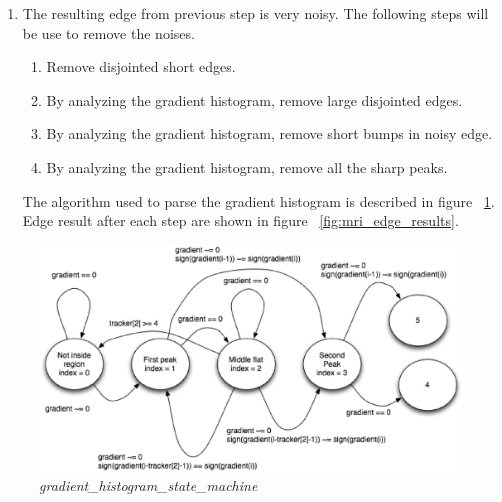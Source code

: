\begin{enumerate}
  \item The resulting edge from previous step is very noisy. The following steps will be use to remove the
    noises. 
    \begin{enumerate}
      \item Remove disjointed short edges.
      \item By analyzing the gradient histogram, remove large disjointed edges.
      \item By analyzing the gradient histogram, remove short bumps in noisy edge.
      \item By analyzing the gradient histogram, remove all the sharp peaks. 
    \end{enumerate}
    The algorithm used to parse the gradient histogram is described in figure ~\ref{fig:histogram_state_machine}. Edge result after each step are shown in figure ~\ref{fig:mri_edge_results}.
\end{enumerate}

\begin{figure}[htb]
  \hfill
  \begin{minipage}[b]{5in}
    \centering
    \centerline{\mbox{\includegraphics[width=5in]{data_extraction/images/MRI/histogram_state_machine.eps}}}
  \end{minipage}
  \hfill
  \caption{\emph{gradient_histogram_state_machine}}
  \label{fig:histogram_state_machine}
\end{figure}

